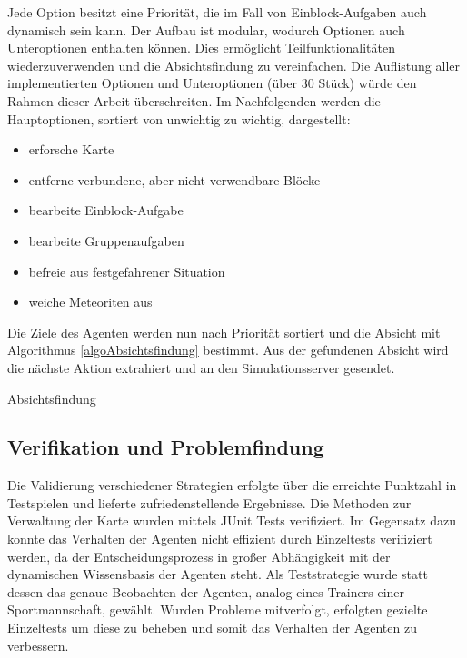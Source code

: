 \documentclass[runningheads]{llncs}
\begin{document}
Jede Option besitzt eine Priorität, die im Fall von Einblock-Aufgaben auch dynamisch sein kann. Der Aufbau ist modular, wodurch Optionen auch Unteroptionen enthalten können. Dies ermöglicht Teilfunktionalitäten wiederzuverwenden und die Absichtsfindung zu vereinfachen. Die Auflistung aller implementierten Optionen und Unteroptionen (über 30 Stück) würde den Rahmen dieser Arbeit überschreiten. Im Nachfolgenden werden die Hauptoptionen, sortiert von unwichtig zu wichtig, dargestellt:

\begin{itemize}
\item erforsche Karte
\item entferne verbundene, aber nicht verwendbare Blöcke
\item bearbeite Einblock-Aufgabe
\item bearbeite Gruppenaufgaben
\item befreie aus festgefahrener Situation
\item weiche Meteoriten aus
\end{itemize}

Die Ziele des Agenten werden nun nach Priorität sortiert und die Absicht mit Algorithmus \ref{algoAbsichtsfindung} bestimmt. Aus der gefundenen Absicht wird die nächste Aktion extrahiert und an den Simulationsserver gesendet.

\begin{algorithm}
\caption{Absichtsfindung}\label{alg:two}
\label{algoAbsichtsfindung}
\end{algorithm}


\subsection{Verifikation und Problemfindung}\label{verifikation}
Die Validierung verschiedener Strategien erfolgte über die erreichte Punktzahl in Testspielen und lieferte zufriedenstellende Ergebnisse. Die Methoden zur Verwaltung der Karte wurden mittels JUnit Tests \cite{JUnit} verifiziert. Im Gegensatz dazu konnte das Verhalten der Agenten nicht effizient durch Einzeltests verifiziert werden, da der Entscheidungsprozess in großer Abhängigkeit mit der dynamischen Wissensbasis der Agenten steht.
Als Teststrategie wurde statt dessen das genaue Beobachten der Agenten, analog eines Trainers einer Sportmannschaft, gewählt. Wurden Probleme mitverfolgt, erfolgten gezielte Einzeltests um diese zu beheben und somit das Verhalten der Agenten zu verbessern.
\end{document}

